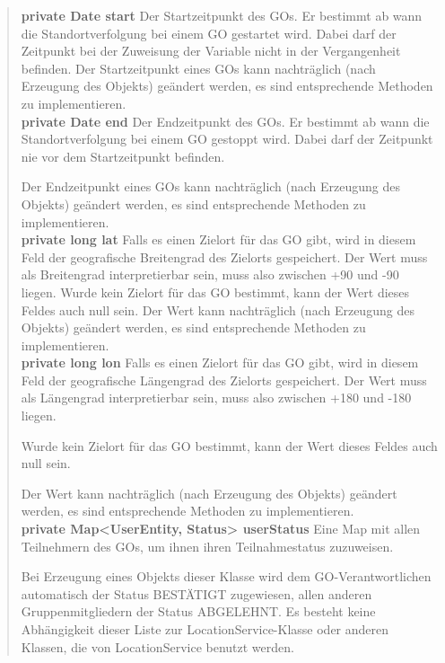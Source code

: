 \documentclass[11pt,a4paper]{article}
\begin{document}
{{{{\begin{verse}
{{\bf private Date start}} Der Startzeitpunkt des GOs. Er bestimmt ab wann die Standortverfolgung bei einem GO gestartet wird. Dabei darf der Zeitpunkt
      bei der Zuweisung der Variable nicht in der Vergangenheit befinden.
      Der Startzeitpunkt eines GOs kann nachträglich (nach Erzeugung des Objekts) geändert werden, es sind entsprechende Methoden zu implementieren.\\[0.5em]
      
{{\bf private Date end}} Der Endzeitpunkt des GOs. Er bestimmt ab wann die Standortverfolgung bei einem GO gestoppt wird. Dabei darf der Zeitpunkt
      nie vor dem Startzeitpunkt befinden.
     
     Der Endzeitpunkt eines GOs kann nachträglich (nach Erzeugung des Objekts) geändert werden, es sind entsprechende Methoden zu implementieren.\\[0.5em]
     
{{\bf private long lat}} Falls es einen Zielort für das GO gibt, wird in diesem Feld der geografische Breitengrad des Zielorts gespeichert. Der Wert muss als Breitengrad interpretierbar sein,
     muss also zwischen +90 und -90 liegen.
     Wurde kein Zielort für das GO bestimmt, kann der Wert dieses Feldes auch null sein. Der Wert kann nachträglich (nach Erzeugung des Objekts) geändert werden, es sind entsprechende Methoden zu implementieren.\\[0.5em]
     
{{\bf private long lon}} Falls es einen Zielort für das GO gibt, wird in diesem Feld der geografische Längengrad des Zielorts gespeichert. Der Wert muss als Längengrad interpretierbar sein, muss also zwischen +180 und -180 liegen.
     
      Wurde kein Zielort für das GO bestimmt, kann der Wert dieses Feldes auch null sein.
     
      Der Wert kann nachträglich (nach Erzeugung des Objekts) geändert werden, es sind entsprechende Methoden zu implementieren.\\[0.5em]
      
{{\bf private Map<UserEntity, Status> userStatus}} Eine Map mit allen Teilnehmern des GOs, um ihnen ihren Teilnahmestatus zuzuweisen.
     
      Bei Erzeugung eines Objekts dieser Klasse wird dem GO-Verantwortlichen automatisch der Status BESTÄTIGT zugewiesen, allen anderen Gruppenmitgliedern der Status
      ABGELEHNT.
      Es besteht keine Abhängigkeit dieser Liste zur LocationService-Klasse oder anderen Klassen, die von LocationService
      benutzt werden.
     

\end{verse}}}}}
\end{document}
